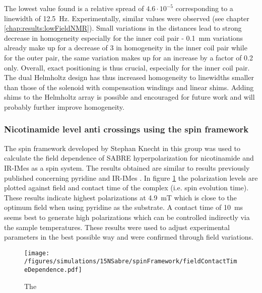         The lowest value found is a relative spread of $4.6 \cdot 10^{-5}$ corresponding to a linewidth of \SI{12.5}{\hertz}. Experimentally, similar values were observed (see chapter \ref{chap:results:lowFieldNMR}). Small variations in the distances lead to strong decrease in homogeneity especially for the inner coil pair - \SI{0.1}{\milli\meter} variations already make up for a decrease of 3 in homogeneity in the inner coil pair while for the outer pair, the same variation makes up for an increase by a factor of 0.2 only. Overall, exact positioning is thus crucial, especially for the inner coil pair. The dual Helmholtz design has thus increased homogeneity to linewidths smaller than those of the solenoid with compensation windings and linear shims. Adding shims to the Helmholtz array is possible and encouraged for future work and will probably further improve homogeneity.
        \subsubsection{Nicotinamide level anti crossings using the spin framework}
        The spin framework developed by Stephan Knecht in this group \cite{knecht_spin_2014} was used to calculate the field dependence of SABRE hyperpolarization for nicotinamide and IR-IMes as a spin system. The results obtained are similar to results previously published concerning pyridine and IR-IMes \cite{hovener_continuous_2014-1}. In figure \ref{figure:results:simulation:nicotinamideSpinSystem} the polarization levels are plotted against field and contact time of the complex (i.e. spin evolution time). These results indicate highest polarizations at \SI{4.9}{\milli\tesla} which is close to the optimum field when using pyridine as the substrate. A contact time of \SI{10}{\milli\second} seems best to generate high polarizations which can be controlled indirectly via the sample temperatures. These results were used to adjust experimental parameters in the best possible way and were confirmed through field variations.
        \begin{figure}
            \centering
            \texttt{[image: /figures/simulations/15NSabre/spinFramework/fieldContactTimeDependence.pdf]}
            \caption[Spin density matrix calculations]{The }
            \label{figure:results:simulation:nicotinamideSpinSystem}
        \end{figure}
